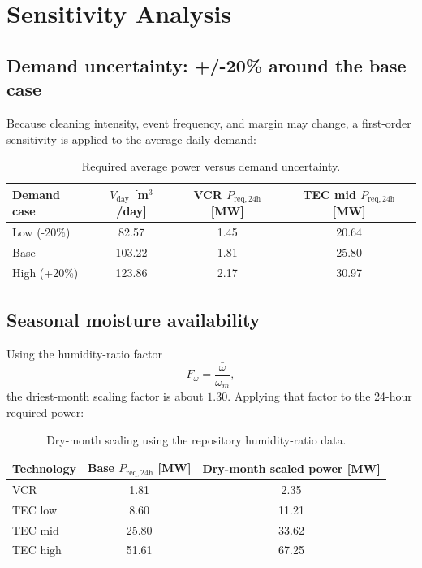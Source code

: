 \documentclass[11pt,a4paper]{article}
\begin{document}
\section{Sensitivity Analysis}
\subsection{Demand uncertainty: +/-20\% around the base case}
Because cleaning intensity, event frequency, and margin may change, a first-order sensitivity is applied to the average daily demand:
\begin{table}[h]
\centering
\caption{Required average power versus demand uncertainty.}
\begin{tabular}{@{}lccc@{}}
\toprule
\textbf{Demand case} & \textbf{$V_{\mathrm{day}}$ [m$^3$/day]} & \textbf{VCR $P_{\mathrm{req,24h}}$ [MW]} & \textbf{TEC mid $P_{\mathrm{req,24h}}$ [MW]} \\
\midrule
Low (-20\%) & 82.57 & 1.45 & 20.64 \\
Base & 103.22 & 1.81 & 25.80 \\
High (+20\%) & 123.86 & 2.17 & 30.97 \\
\bottomrule
\end{tabular}
\end{table}

\subsection{Seasonal moisture availability}
Using the humidity-ratio factor
\begin{equation}
F_{\omega}=\frac{\bar{\omega}}{\omega_m},
\end{equation}
the driest-month scaling factor is about $1.30$. Applying that factor to the 24-hour required power:
\begin{table}[h]
\centering
\caption{Dry-month scaling using the repository humidity-ratio data.}
\begin{tabular}{@{}lcc@{}}
\toprule
\textbf{Technology} & \textbf{Base $P_{\mathrm{req,24h}}$ [MW]} & \textbf{Dry-month scaled power [MW]} \\
\midrule
VCR & 1.81 & 2.35 \\
TEC low & 8.60 & 11.21 \\
TEC mid & 25.80 & 33.62 \\
TEC high & 51.61 & 67.25 \\
\bottomrule
\end{tabular}
\end{table}
\end{document}
